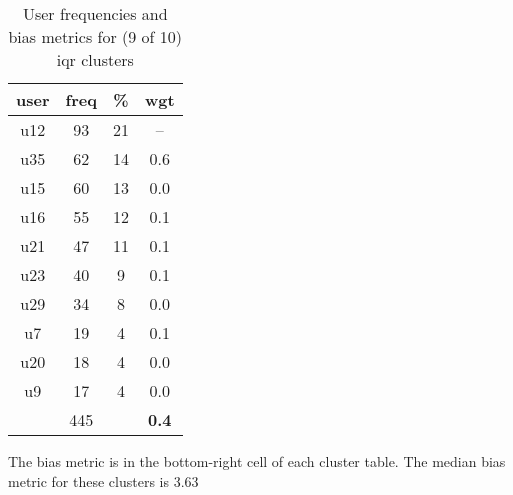 \begin{table}
\begin{tabular}{ |c|c|c|c| }
	\hline
	\textbf{user} & \textbf{freq} & \textbf{\%} & \textbf{wgt} \\
	\hline
	u12 & 93 & 21 & -- \\
	u35 & 62 & 14 & 0.6 \\
	u15 & 60 & 13 & 0.0 \\
	u16 & 55 & 12 & 0.1 \\
	u21 & 47 & 11 & 0.1 \\
	u23 & 40 & 9 & 0.1 \\
	u29 & 34 & 8 & 0.0 \\
	u7 & 19 & 4 & 0.1 \\
	u20 & 18 & 4 & 0.0 \\
	u9 & 17 & 4 & 0.0 \\
	 & 445 & & \textbf{0.4} \\
	\hline
\end{tabular}
\caption{User frequencies and bias metrics for (9 of 10) iqr clusters}
{\small The bias metric is in the bottom-right cell of each cluster table. The median bias metric for these clusters is 3.63}
\end{table}


